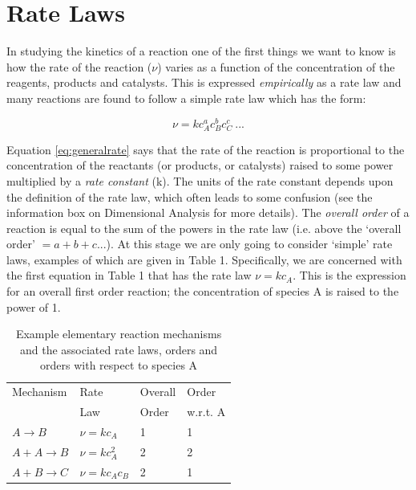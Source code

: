 \documentclass[	DIV=calc,%
							paper=a4,%
							fontsize=11pt,%
							twocolumn]{scrartcl}	 					%
\begin{document}
\section*{Rate Laws}
In studying the kinetics of a reaction one of the first things we want to know is how the rate of the reaction ($\nu$) varies as a function of the concentration of the reagents, products and catalysts. This is expressed \emph{empirically} as a rate law and many reactions are found to follow a simple rate law which has the form:
\begin{tcolorbox}[title=Definition: General Rate Law]
    \begin{equation}
        \nu = k c_A^a c_B^b c_C^c ~...
        \label{eq:generalrate}
    \end{equation}
\end{tcolorbox}

\noindent Equation \ref{eq:generalrate} says that the rate of the reaction is proportional to the concentration of the reactants (or products, or catalysts) raised to some power multiplied by a \emph{rate constant} (k). The units of the rate constant depends upon the definition of the rate law, which often leads to some confusion (see the information box on Dimensional Analysis for more details). 
The \emph{overall order} of a reaction is equal to the sum of the powers in the rate law (i.e. above the `overall order' $= a+b+c$...). At this stage we are only going to consider `simple' rate laws, examples of which are given in Table 1.
Specifically, we are concerned with the first equation in Table 1 that has the rate law $\nu = kc_A$. This is the expression for an overall first order reaction; the concentration of species A is raised to the power of 1.

\begin{table}[h]
    \begin{tabular}{llll}
        Mechanism &Rate  &Overall  & Order \\
         &Law &Order & w.r.t. A\\
        $A \rightarrow B$ & $\nu = kc_A$  & 1 & 1 \\
        $A + A \rightarrow B$ & $\nu = kc^2_A$  & 2 & 2 \\
        $A + B \rightarrow C$ & $\nu = kc_Ac_B$  & 2 & 1
    \end{tabular}
    \captionsetup{format=plain}
    \caption{Example elementary reaction mechanisms and the associated rate laws, orders and orders with respect to species A} 
\end{table}
\end{document}
